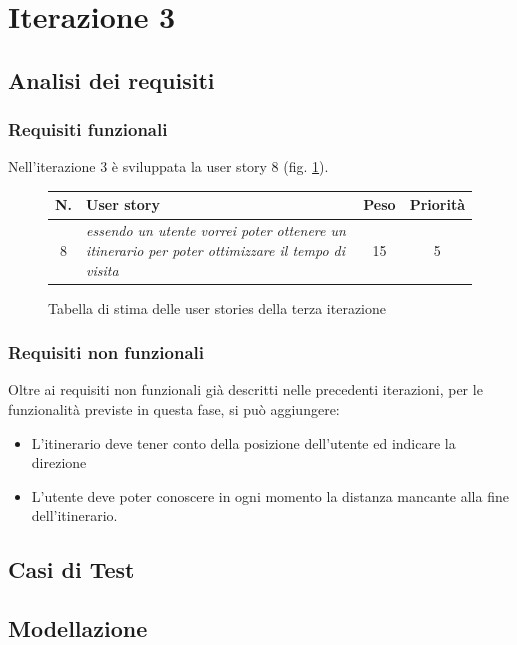 \clearpage

\section{Iterazione 3}

\subsection{Analisi dei requisiti}
\subsubsection{Requisiti funzionali}
Nell'iterazione 3 è sviluppata la user story 8 (fig. \ref{userstoriestableterzaiterazione}). 
\begin{figure}
\begin{center}
\begin{tabular}[c]{|c|p{6cm}|c|c|}
\hline
N. & User story & Peso & Priorità\\
\hline
8 & \textit{essendo un utente vorrei poter ottenere un itinerario per poter ottimizzare il tempo di visita} & 15 & 5\\
\hline
\end{tabular}
\caption{Tabella di stima delle user stories della terza iterazione\label{userstoriestableterzaiterazione}}
\end{center}
\end{figure}

\clearpage
\subsubsection{Requisiti non funzionali}
Oltre ai requisiti non funzionali già descritti nelle precedenti iterazioni, per le funzionalità previste in questa fase, si può aggiungere:
\begin{itemize}
\item L'itinerario deve tener conto della posizione dell'utente ed indicare la direzione
\item L'utente deve poter conoscere in ogni momento la distanza mancante alla fine dell'itinerario.
\end{itemize}

\subsection{Casi di Test}
\subsection{Modellazione}
